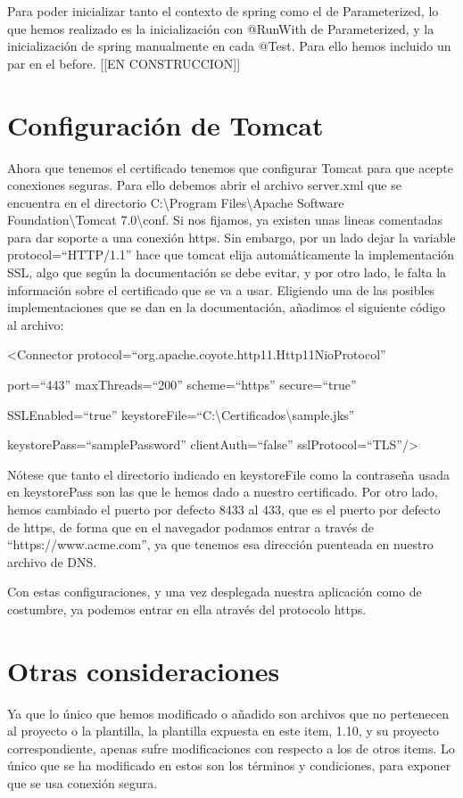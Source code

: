 \documentclass[a4paper]{article}
\begin{document}
Para poder inicializar tanto el contexto de spring como el de Parameterized, lo que hemos realizado es la inicialización con @RunWith de Parameterized, y la inicialización de spring manualmente en cada @Test. Para ello hemos incluido un par en el before. [[EN CONSTRUCCION]]

\section{Configuración de Tomcat}

Ahora que tenemos el certificado tenemos que configurar Tomcat para que acepte conexiones seguras. Para ello debemos abrir el archivo server.xml que se encuentra en el directorio C:\textbackslash Program Files\textbackslash Apache Software Foundation\textbackslash Tomcat 7.0\textbackslash conf. Si nos fijamos, ya existen unas lineas comentadas para dar soporte a una conexión https. Sin embargo, por un lado dejar la variable protocol=``HTTP/1.1'' hace que tomcat elija automáticamente la implementación SSL, algo que según la documentación se debe evitar, y por otro lado, le falta la información sobre el certificado que se va a usar. Eligiendo una de las posibles implementaciones que se dan en la documentación, añadimos el siguiente código al archivo:

\noindent\colorbox{shadecolor}{\textless Connector protocol=``org.apache.coyote.http11.Http11NioProtocol''}

\noindent\colorbox{shadecolor}{port=``443'' maxThreads=``200'' scheme=``https'' secure=``true''}

\noindent\colorbox{shadecolor}{SSLEnabled=``true'' keystoreFile=``C:\textbackslash Certificados\textbackslash sample.jks''}

\noindent\colorbox{shadecolor}{keystorePass=``samplePassword'' clientAuth=``false'' sslProtocol=``TLS''/\textgreater }

Nótese que tanto el directorio indicado en keystoreFile como la contraseña usada en keystorePass son las que le hemos dado a nuestro certificado. Por otro lado, hemos cambiado el puerto por defecto 8433 al 433, que es el puerto por defecto de https, de forma que en el navegador podamos entrar a través de ``https://www.acme.com'', ya que tenemos esa dirección puenteada en nuestro archivo de DNS.

Con estas configuraciones, y una vez desplegada nuestra aplicación como de costumbre, ya podemos entrar en ella através del protocolo https.

\section{Otras consideraciones}
Ya que lo único que hemos modificado o añadido son archivos que no pertenecen al proyecto o la plantilla, la plantilla expuesta en este item, 1.10, y su proyecto correspondiente, apenas sufre modificaciones con respecto a los de otros items. Lo único que se ha modificado en estos son los términos y condiciones, para exponer que se usa conexión segura.
\end{document}
